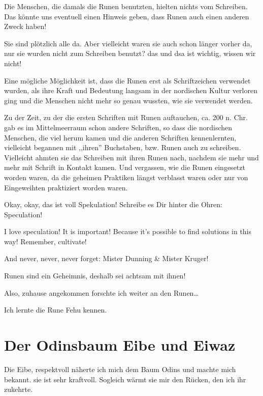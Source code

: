 \documentclass[11pt,titlepage,a5paper]{book}
\begin{document}
Die Menschen, die damals die Runen benutzten, hielten nichts vom Schreiben. Das könnte uns eventuell einen Hinweis geben, dass Runen auch einen anderen Zweck haben!

Sie sind plötzlich alle da. Aber vielleicht waren sie auch schon länger vorher da, nur sie wurden nicht zum Schreiben benutzt? das und dsa ist wichtig, wissen wir nicht!

Eine mögliche Möglichkeit ist, dass die Runen erst als Schriftzeichen verwendet wurden, als ihre Kraft und Bedeutung langsam in der nordischen Kultur verloren ging und die Menschen nicht mehr so genau wussten, wie sie verwendet werden.

Zu der Zeit, zu der die ersten Schriften mit Runen auftauchen, ca. 200 n. Chr. gab es im Mittelmeerraum schon andere Schriften, so dass die nordischen Menschen, die viel herum kamen und die anderen Schriften kennenlernten, vielleicht begannen mit ,,ihren'' Buchstaben, bzw. Runen auch zu schreiben. Vielleicht ahmten sie das Schreiben mit ihren Runen nach, nachdem sie mehr und mehr mit Schrift in Kontakt kamen. Und vergassen, wie die Runen eingesetzt worden waren, da die geheimen Praktiken längst verblasst waren oder nur von Eingeweihten praktiziert worden waren.

\begin{LARGE} Okay, okay, das ist 
voll Spekulation! Schreibe es Dir hinter die Ohren: Speculation!
\end{LARGE}

I love speculation! It is important! Because it's possible to find solutions in this way! Remember, cultivate! 

\begin{LARGE}
And never, never, never forget: Mister Dunning \& Mister Kruger!
\end{LARGE}

Runen sind ein Geheimnis, deshalb sei achtsam mit ihnen!

Also, zuhause angekommen forschte ich weiter an den Runen\dots

Ich lernte die Rune Fehu  kennen. 

\section{Der Odinsbaum Eibe und Eiwaz  }

Die Eibe, respektvoll näherte ich mich dem Baum Odins und machte mich bekannt. sie ist sehr kraftvoll. Sogleich wärmt sie mir den Rücken, den ich ihr zukehrte.
\end{document}
